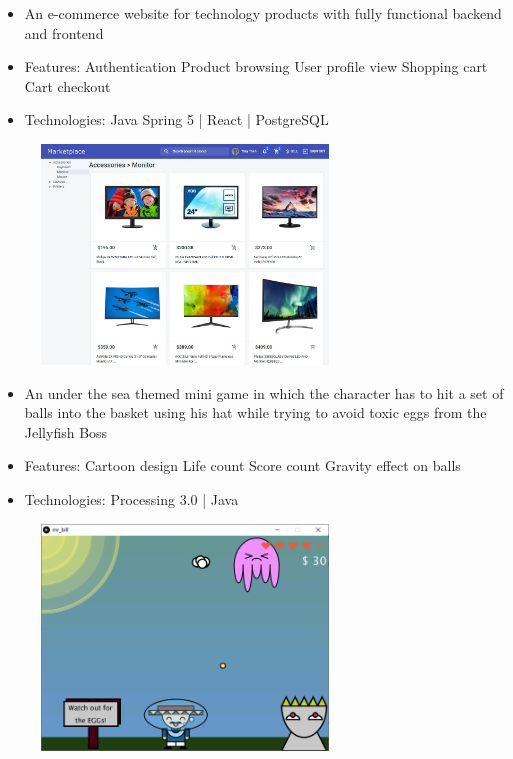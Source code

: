 \documentclass[10pt,a4paper,ragged2e]{altacv}
\begin{document}
\begin{paracol}{2}

\begin{itemize}
	\item An e-commerce website for technology products with fully functional backend and frontend
	\item Features:
	\subitem Authentication
	\subitem Product browsing
	\subitem User profile view
	\subitem Shopping cart
	\subitem Cart checkout
	\item Technologies: Java Spring 5 | React | PostgreSQL
\end{itemize}

\begin{figure}[htbp]
	\centerline{\includegraphics[width=3in]{images/marketplace_home.jpg}}
\end{figure}

\switchcolumn

\begin{itemize}
	\item An under the sea themed mini game in which the character has to hit a set of balls into the basket using his hat while trying to avoid toxic eggs from the Jellyfish Boss
	\item Features:
	\subitem Cartoon design
	\subitem Life count
	\subitem Score count
	\subitem Gravity effect on balls
	\item Technologies: Processing 3.0 | Java
\end{itemize}

\begin{figure}[htbp]
	\centerline{\includegraphics[width=3in]{images/mr-bill.png}}
\end{figure}


\end{paracol}
\end{document}

